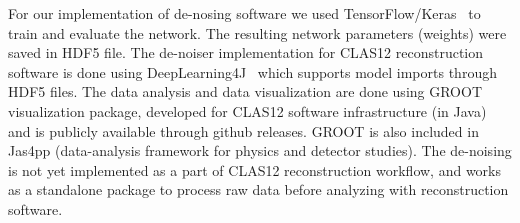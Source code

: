 For our implementation of de-nosing software we used TensorFlow/Keras~\cite{keras-website} to train 
and evaluate the network. The resulting network parameters (weights) were saved 
in HDF5 file. The de-noiser implementation for CLAS12 reconstruction software is 
done using DeepLearning4J~\cite{dl4j-website} which supports model imports 
through HDF5 files. 
The data analysis and data visualization are done using GROOT~\cite{groot-github} visualization 
package, developed for CLAS12 software infrastructure (in Java) and is publicly available 
through github releases. GROOT is also included in Jas4pp\cite{Chekanov:2020bja}  
(data-analysis framework for physics and detector studies). The de-noising is not yet implemented 
as a part of CLAS12 reconstruction workflow, and works as a standalone package to process raw data before 
analyzing with reconstruction software.

